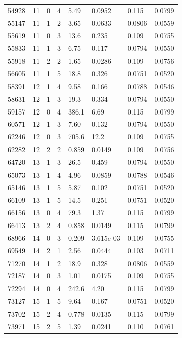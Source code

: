 \documentclass[preview]{standalone}
\begin{document}
{{{\begin{tabular}{L{1.2cm}C{1.2cm} C{0.3cm}C{0.5cm} C{1.4cm}C{1.4cm} C{1.4cm}C{1.4cm}}
  54928  &    11  & 0     &  4 &  5.49  & 0.0952  & 0.115 &  0.0799   \\ 
  55147  &    11  & 1     &  2 &  3.65  & 0.0633  & 0.0806 &  0.0559   \\ 
  55619  &    11  & 0     &  3 &  13.6  & 0.235  & 0.109 &  0.0755   \\ 
  55833  &    11  & 1     &  3 &  6.75  & 0.117  & 0.0794 &  0.0550   \\ 
  55918  &    11  & 2     &  2 &  1.65  & 0.0286  & 0.109 &  0.0756   \\ 
  56605  &    11  & 1     &  5 &  18.8  & 0.326  & 0.0751 &  0.0520   \\ 
  58391  &    12  & 1     &  4 &  9.58  & 0.166  & 0.0788 &  0.0546   \\ 
  58631  &    12  & 1     &  3 &  19.3  & 0.334  & 0.0794 &  0.0550   \\ 
  59157  &    12  & 0     &  4 &  386.1  & 6.69  & 0.115 &  0.0799   \\ 
  60571  &    12  & 1     &  3 &  7.60  & 0.132  & 0.0794 &  0.0550   \\ 
  62246  &    12  & 0     &  3 &  705.6  & 12.2  & 0.109 &  0.0755   \\ 
  62282  &    12  & 2     &  2 &  0.859  & 0.0149  & 0.109 &  0.0756   \\ 
  64720  &    13  & 1     &  3 &  26.5  & 0.459  & 0.0794 &  0.0550   \\ 
  65073  &    13  & 1     &  4 &  4.96  & 0.0859  & 0.0788 &  0.0546   \\ 
  65146  &    13  & 1     &  5 &  5.87  & 0.102  & 0.0751 &  0.0520   \\ 
  66109  &    13  & 1     &  5 &  14.5  & 0.251  & 0.0751 &  0.0520   \\ 
  66156  &    13  & 0     &  4 &  79.3  & 1.37  & 0.115 &  0.0799   \\ 
  66413  &    13  & 2     &  4 &  0.858  & 0.0149  & 0.115 &  0.0799   \\ 
  68966  &    14  & 0     &  3 &  0.209  & 3.615e-03  & 0.109 &  0.0755   \\ 
  69549  &    14  & 2     &  1 &  2.56  & 0.0444  & 0.103 &  0.0711   \\ 
  71270  &    14  & 1     &  2 &  18.9  & 0.328  & 0.0806 &  0.0559   \\ 
  72187  &    14  & 0     &  3 &  1.01  & 0.0175  & 0.109 &  0.0755   \\ 
  72294  &    14  & 0     &  4 &  242.6  & 4.20  & 0.115 &  0.0799   \\ 
  73127  &    15  & 1     &  5 &  9.64  & 0.167  & 0.0751 &  0.0520   \\ 
  73702  &    15  & 2     &  4 &  0.778  & 0.0135  & 0.115 &  0.0799   \\ 
  73971  &    15  & 2     &  5 &  1.39  & 0.0241  & 0.110 &  0.0761   \\ 
\hline 
\end{tabular} 

}}}
\end{document}
